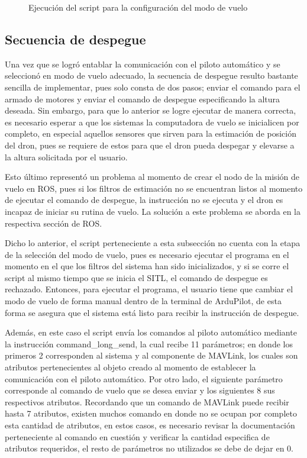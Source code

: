 \begin{figure}[ht]
    \centering
    \hfill
    \caption{Ejecución del script para la configuración del modo de vuelo}
    \label{fig:pymav_modes}
\end{figure}


\subsection{Secuencia de despegue}

Una vez que se logró entablar la comunicación con el piloto automático y se seleccionó en modo de vuelo adecuado, la secuencia de despegue resulto bastante sencilla de implementar, pues solo consta de dos pasos; enviar el comando para el armado de motores y enviar el comando de despegue especificando la altura deseada. Sin embargo, para que lo anterior se logre ejecutar de manera correcta, es necesario esperar a que los sistemas la computadora de vuelo se inicialicen por completo, en especial aquellos sensores que sirven para la estimación de posición del dron, pues se requiere de estos para que el dron pueda despegar y elevarse a la altura solicitada por el usuario.

Esto último representó un problema al momento de crear el nodo de la misión de vuelo en ROS, pues si los filtros de estimación no se encuentran listos al momento de ejecutar el comando de despegue, la instrucción no se ejecuta y el dron es incapaz de iniciar su rutina de vuelo. La solución a este problema se aborda en la respectiva sección de ROS.

Dicho lo anterior, el script perteneciente a esta subsección no cuenta con la etapa de la selección del modo de vuelo, pues es necesario ejecutar el programa en el momento en el que los filtros del sistema han sido inicializados, y si se corre el script al mismo tiempo que  se inicia el SITL, el comando de despegue es rechazado. Entonces, para ejecutar el programa, el usuario tiene que cambiar el modo de vuelo de forma manual dentro de la terminal de ArduPilot, de esta forma se asegura que el sistema está listo para recibir la instrucción de despegue.

Además, en este caso el script envía los comandos al piloto automático mediante la instrucción command\_long\_send, la cual recibe 11 parámetros; en donde los primeros 2 corresponden al sistema y al componente de MAVLink, los cuales son atributos pertenecientes al objeto creado al momento de establecer la comunicación con el piloto automático. Por otro lado, el siguiente parámetro corresponde al comando de vuelo que se desea enviar y los siguientes 8 sus respectivos atributos. Recordando que un comando de MAVLink puede recibir hasta 7 atributos, existen muchos comando en donde no se ocupan por completo esta cantidad de atributos, en estos casos, es necesario revisar la documentación perteneciente al comando en cuestión y verificar la cantidad especifica de atributos requeridos, el resto de parámetros no utilizados se debe de dejar en 0.

